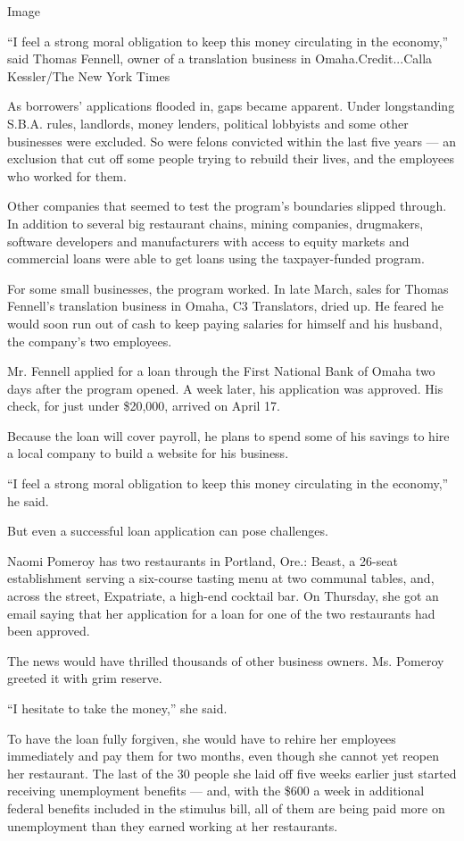 Image

``I feel a strong moral obligation to keep this money circulating in the
economy,'' said Thomas Fennell, owner of a translation business in
Omaha.Credit...Calla Kessler/The New York Times

As borrowers' applications flooded in, gaps became apparent. Under
longstanding S.B.A. rules, landlords, money lenders, political lobbyists
and some other businesses were excluded. So were felons convicted within
the last five years --- an exclusion that cut off some people trying to
rebuild their lives, and the employees who worked for them.

Other companies that seemed to test the program's boundaries slipped
through. In addition to several big restaurant chains, mining companies,
drugmakers, software developers and manufacturers with access to equity
markets and commercial loans were able to get loans using the
taxpayer-funded program.

For some small businesses, the program worked. In late March, sales for
Thomas Fennell's translation business in Omaha, C3 Translators, dried
up. He feared he would soon run out of cash to keep paying salaries for
himself and his husband, the company's two employees.

Mr. Fennell applied for a loan through the First National Bank of Omaha
two days after the program opened. A week later, his application was
approved. His check, for just under \$20,000, arrived on April 17.

Because the loan will cover payroll, he plans to spend some of his
savings to hire a local company to build a website for his business.

``I feel a strong moral obligation to keep this money circulating in the
economy,'' he said.

But even a successful loan application can pose challenges.

Naomi Pomeroy has two restaurants in Portland, Ore.: Beast, a 26-seat
establishment serving a six-course tasting menu at two communal tables,
and, across the street, Expatriate, a high-end cocktail bar. On
Thursday, she got an email saying that her application for a loan for
one of the two restaurants had been approved.

The news would have thrilled thousands of other business owners. Ms.
Pomeroy greeted it with grim reserve.

``I hesitate to take the money,'' she said.

To have the loan fully forgiven, she would have to rehire her employees
immediately and pay them for two months, even though she cannot yet
reopen her restaurant. The last of the 30 people she laid off five weeks
earlier just started receiving unemployment benefits --- and, with the
\$600 a week in additional federal benefits included in the stimulus
bill, all of them are being paid more on unemployment than they earned
working at her restaurants.

